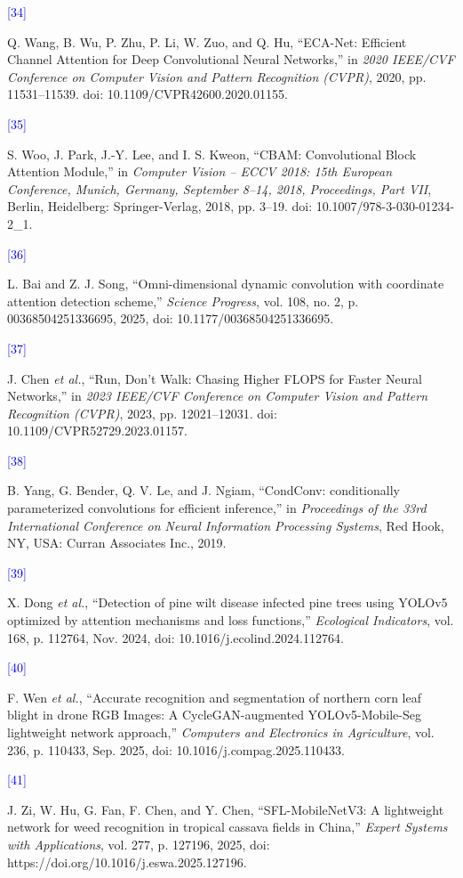 \documentclass[
]{article}
\begin{document}
\hypertarget{ref:34}{\textcolor{blue}{[34]}} Q. Wang, B. Wu,
P. Zhu, P. Li, W. Zuo, and Q. Hu, ``ECA-Net: Efficient Channel Attention
for Deep Convolutional Neural Networks,'' in \emph{2020 IEEE/CVF
Conference on Computer Vision and Pattern Recognition (CVPR)}, 2020, pp.
11531--11539. doi: 10.1109/CVPR42600.2020.01155.

\hypertarget{ref:35}{\textcolor{blue}{[35]}} S. Woo, J.
Park, J.-Y. Lee, and I. S. Kweon, ``CBAM: Convolutional Block Attention
Module,'' in \emph{Computer Vision -- ECCV 2018: 15th European
Conference, Munich, Germany, September 8--14, 2018, Proceedings, Part
VII}, Berlin, Heidelberg: Springer-Verlag, 2018, pp. 3--19. doi:
10.1007/978-3-030-01234-2\_1.

\hypertarget{ref:36}{\textcolor{blue}{[36]}} L. Bai and Z. J. Song,
``Omni-dimensional dynamic convolution with coordinate attention
detection scheme,'' \emph{Science Progress}, vol. 108, no. 2, p.
00368504251336695, 2025, doi: 10.1177/00368504251336695.

\hypertarget{ref:37}{\textcolor{blue}{[37]}} J. Chen
\emph{et al.}, ``Run, Don't Walk: Chasing Higher FLOPS for Faster Neural
Networks,'' in \emph{2023 IEEE/CVF Conference on Computer Vision and
Pattern Recognition (CVPR)}, 2023, pp. 12021--12031. doi:
10.1109/CVPR52729.2023.01157.

\hypertarget{ref:38}{\textcolor{blue}{[38]}} B. Yang, G. Bender, Q. V. Le, and
J. Ngiam, ``CondConv: conditionally parameterized convolutions for
efficient inference,'' in \emph{Proceedings of the 33rd International
Conference on Neural Information Processing Systems}, Red Hook, NY, USA:
Curran Associates Inc., 2019.

\hypertarget{ref:39}{\textcolor{blue}{[39]}} X. Dong \emph{et al.}, ``Detection
of pine wilt disease infected pine trees using YOLOv5 optimized by
attention mechanisms and loss functions,'' \emph{Ecological Indicators},
vol. 168, p. 112764, Nov. 2024, doi:
10.1016/j.ecolind.2024.112764.

\hypertarget{ref:40}{\textcolor{blue}{[40]}} F. Wen \emph{et al.}, ``Accurate
recognition and segmentation of northern corn leaf blight in drone RGB
Images: A CycleGAN-augmented YOLOv5-Mobile-Seg lightweight network
approach,'' \emph{Computers and Electronics in Agriculture}, vol. 236,
p. 110433, Sep. 2025, doi: 10.1016/j.compag.2025.110433.

\hypertarget{ref:41}{\textcolor{blue}{[41]}} J. Zi,
W. Hu, G. Fan, F. Chen, and Y. Chen, ``SFL-MobileNetV3: A lightweight
network for weed recognition in tropical cassava fields in China,''
\emph{Expert Systems with Applications}, vol. 277, p. 127196, 2025, doi:
https://doi.org/10.1016/j.eswa.2025.127196.
\end{document}
